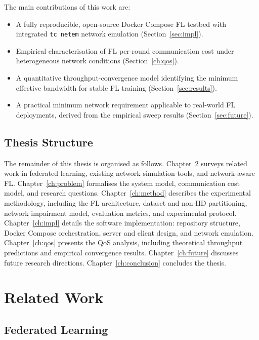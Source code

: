 \documentclass[12pt,a4paper]{report}
\begin{document}
The main contributions of this work are:
\begin{itemize}
  \item A fully reproducible, open-source Docker Compose FL testbed with integrated
        \texttt{tc netem} network emulation (Section~\ref{sec:impl}).
  \item Empirical characterisation of FL per-round communication cost under
        heterogeneous network conditions (Section~\ref{ch:qos}).
  \item A quantitative throughput-convergence model identifying the minimum
        effective bandwidth for stable FL training (Section~\ref{sec:results}).
  \item A practical minimum network requirement applicable to real-world FL
        deployments, derived from the empirical sweep results (Section~\ref{sec:future}).
\end{itemize}

\section{Thesis Structure}

The remainder of this thesis is organised as follows.
Chapter~\ref{ch:related} surveys related work in federated learning, existing
network simulation tools, and network-aware FL.
Chapter~\ref{ch:problem} formalises the system model, communication cost model,
and research questions.
Chapter~\ref{ch:method} describes the experimental methodology, including the FL
architecture, dataset and non-IID partitioning, network impairment model, evaluation
metrics, and experimental protocol.
Chapter~\ref{ch:impl} details the software implementation: repository structure,
Docker Compose orchestration, server and client design, and network emulation.
Chapter~\ref{ch:qos} presents the QoS analysis, including theoretical throughput
predictions and empirical convergence results.
Chapter~\ref{ch:future} discusses future research directions.
Chapter~\ref{ch:conclusion} concludes the thesis.

\chapter{Related Work}
\label{ch:related}

\section{Federated Learning}
\end{document}
